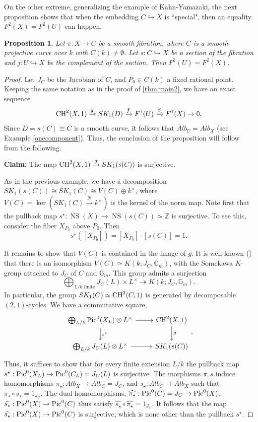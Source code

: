 \documentclass[12pt]{amsart}
\newtheorem{prop}[prop]{Proposition}
\theoremstyle{remark}
\newcommand{\G}{{\mathbb G}}
\newcommand{\Z}{{\mathbb Z}}
\renewcommand{\1}{{\mathbb{S}}}
\newcommand{\CH}{{\rm CH}}
\newcommand{\Pic}{{\rm Pic}}
\newcommand{\NS}{{\operatorname{NS}}}
\newcommand{\<}{\langle}
\renewcommand{\>}{\rangle}
\begin{document}
 On the other extreme, generalizing the example of Kahn-Yamazaki, the next proposition shows that when the embedding $C\hookrightarrow X$ is ``special", then an equality $F^2(X)=F^2(U)$ can happen. 


\begin{prop}\label{prop:secsoffibration} Let $\pi:X\to C$ be a smooth  fibration, where $C$ is a smooth projective curve over $k$ with $C(k)\neq\emptyset$. Let $s:C\hookrightarrow X$ be a section of the fibration and  $j:U\hookrightarrow X$ be the complement of the section. Then $F^2(U)=F^2(X)$. 
\end{prop}

\begin{proof} Let $J_C$ be the Jacobian of $C$, and $P_0\in C(k)$ a fixed rational point. 
Keeping the same notation as in the proof of \autoref{thm:main2}, we have an exact sequence
\[\CH^2(X,1)\xrightarrow{g}SK_1(D)\xrightarrow{f}F^1(U)\xrightarrow{\beta}F^1(X)\to 0.\] Since $D=s(C)\cong C$ is a smooth curve, it follows that $Alb_U=Alb_X$ (see Example \ref{onecomponent}). Thus, the conclusion of the proposition will follow from the following.

\textbf{Claim:} The map $\CH^2(X,1)\xrightarrow{g}SK_1(s(C))$ is surjective. 


As in the previous example, we have a decomposition $SK_1(s(C))\cong SK_1(C)\cong V(C)\oplus k^\times$, where $V(C)=\ker(SK_1(C)\xrightarrow{N}k^\times)$ is the kernel of the norm map. Note first that the pullback map $s^\star:\NS(X)\to\NS(s(C))\simeq\Z$ is surjective. To see this, consider the fiber $X_{P_0}$ above $P_0$. Then 
\[s^\star([X_{P_0}])=[X_{P_0}]\cdot [s(C)]=1.\] 

 

It remains to show that $V(C)$ is contained in the image of $g$.  It is well-known (\cite[Theorem 2.1]{Som}) that there is an isomorphism $V(C)\simeq K(k;J_C,\G_m)$, with the Somekawa $K$-group attached to $J_C$ of $C$ and $\G_m$. This group admits a surjection 
\[\bigoplus_{L/k\text{ finite}}J_C(L)\times L^\times\twoheadrightarrow K(k;J_C,\G_m).\] In particular, the group $SK_1(C)\simeq \CH^2(C, 1)$ is generated by decomposable $(2,1)$-cycles. We have a commutative square,
\[\begin{tikzcd} \bigoplus_{L/k} \Pic^0(X_L)\otimes L^\times \ar{r} \ar{d}{s^\star} & \CH^2(X,1) \ar{d}{g} \\
\bigoplus_{L/k} J_C(L)\otimes L^\times \ar{r} & SK_1(s(C)) 
\end{tikzcd}.\]  Thus, it suffices to show that for every finite extension $L/k$ the pullback map $s^\star:\Pic^0(X_L)\to \Pic^0(C_L)= J_C(L)$ is surjective. 
The morphisms $\pi, s$ induce homomorphisms $\pi_\star:Alb_X\to Alb_C=J_C$, and $s_\star: Alb_C\to Alb_X$ such that $\pi_\star\circ  s_\star=1_{J_C}$. The dual homomorphisms,
$\widehat{\pi_\star}: \Pic^0(C)=J_C\to \Pic^0(X)$, $\widehat{s_\star}:\Pic^0(X)\to\Pic^0(C)$ thus satisfy $\widehat{s_\star}\circ\widehat{\pi_\star}=1_{J_C}$. It follows that the map $\widehat{s_\star}:\Pic^0(X)\to\Pic^0(C)$ is surjective, which is none other than the pullback $s^\star$. 

\end{proof}
\end{document}
